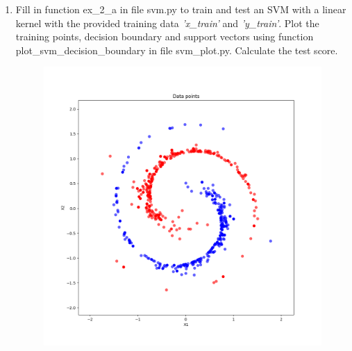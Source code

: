 \documentclass[a4paper]{article}
\begin{document}
\begin{enumerate}[label=(\alph*)]
\item Fill in function ex\_2\_a in file svm.py to train and test an SVM with a linear kernel with the provided training data \textit{'x\_train'} and \textit{'y\_train'}. Plot the training points, decision boundary and support vectors using function plot\_svm\_decision\_boundary in file svm\_plot.py. Calculate the test score.

\begin{figure}[htp]
\centering
\begin{minipage}{0.4\textwidth}
  \includegraphics[scale=0.30]{plots/ex2.png}
  \label{fig:8}
\end{minipage}
\hfill
\begin{minipage}{0.4\textwidth}

\end{minipage}
\end{figure}
\end{enumerate}
\end{document}
